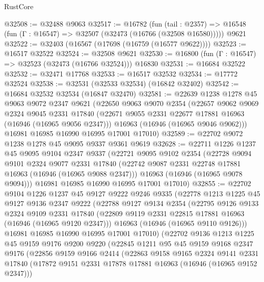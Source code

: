 \begin{lexlean}{RustCore}
\begin{coremodule}
@32508 := @32488 @9063
@32517 := @16782
    (fun (tail : @2357) => @16548 (fun (Γ : @16547) => @32507 (@32473 (@16766 (@32508 @16580)))))
    @9621
@32522 := @32403 (@16567 (@17698 (@16759 (@16577 @9622))))
@32523 := @16517 @32522
@32524 := @32508 @9621
@32530 := @16800 (fun (Γ : @16547) => @32523 (@32473 (@16766 @32524))) @16830
@32531 := @16684 @32522
@32532 := @32471 @17768
@32533 := @16517 @32532
@32534 := @17772 @32524
@32538 := @32531 (@32533 @32534) (@16842 @32402)
@32542 := @16684 @32532 @32534 (@16847 @32470)
@32581 := @22639
    @1238
    @1278
    @45
    @9063
    @9072
    @2347
    @9621
    (@22650
      @9063
      @9070
      @2354
      (@22657
        @9062
        @9069
        @2324
        @9045
        @2331
        @17840
        (@22671 @9055 @2331 @22677 @17881 @16963 (@16946 (@16965 @9056 @2347)))
        @16963
        (@16946 (@16965 @9046 @9062)))
      @16981
      @16985
      @16990
      @16995
      @17001
      @17010)
@32589 := @22702 @9072 @1238 @1278 @45 @9095 @9337 @9361 @9619
@32628 := @22711
    @1226
    @1237
    @45
    @9095
    @9104
    @2347
    @9337
    (@22721
      @9095
      @9102
      @2354
      (@22728
        @9094
        @9101
        @2324
        @9077
        @2331
        @17840
        (@22742 @9087 @2331 @22748 @17881 @16963 (@16946 (@16965 @9088 @2347)))
        @16963
        (@16946 (@16965 @9078 @9094)))
      @16981
      @16985
      @16990
      @16995
      @17001
      @17010)
@32855 := @22702
    @9104
    @1226
    @1237
    @45
    @9127
    @9222
    @9246
    @9335
    (@22778
      @1213
      @1225
      @45
      @9127
      @9136
      @2347
      @9222
      (@22788
        @9127
        @9134
        @2354
        (@22795
          @9126
          @9133
          @2324
          @9109
          @2331
          @17840
          (@22809 @9119 @2331 @22815 @17881 @16963 (@16946 (@16965 @9120 @2347)))
          @16963
          (@16946 (@16965 @9110 @9126)))
        @16981
        @16985
        @16990
        @16995
        @17001
        @17010)
      (@22702
        @9136
        @1213
        @1225
        @45
        @9159
        @9176
        @9200
        @9220
        (@22845
          @1211
          @95
          @45
          @9159
          @9168
          @2347
          @9176
          (@22856
            @9159
            @9166
            @2414
            (@22863
              @9158
              @9165
              @2324
              @9141
              @2331
              @17840
              (@17872 @9151 @2331 @17878 @17881 @16963 (@16946 (@16965 @9152 @2347)))

\end{coremodule}
\end{lexlean}
